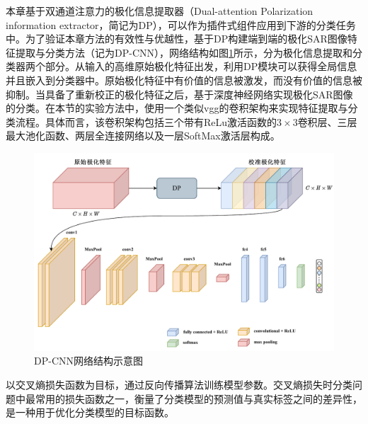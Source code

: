 
本章基于双通道注意力的极化信息提取器（Dual-attention Polarization information extractor，简记为DP），可以作为插件式组件应用到下游的分类任务中。为了验证本章方法的有效性与优越性，基于DP构建端到端的极化SAR图像特征提取与分类方法（记为DP-CNN），网络结构如图\ref{fig:DPCNN}所示，分为极化信息提取和分类器两个部分。从输入的高维原始极化特征出发，利用DP模块可以获得全局信息并且嵌入到分类器中。原始极化特征中有价值的信息被激发，而没有价值的信息被抑制。当具备了重新校正的极化特征之后，基于深度神经网络实现极化SAR图像的分类。在本节的实验方法中，使用一个类似vgg的卷积架构来实现特征提取与分类流程。具体而言，该卷积架构包括三个带有ReLu激活函数的$3\times 3$卷积层、三层最大池化函数、两层全连接网络以及一层SoftMax激活层构成。

\begin{figure}[ht!]
  \centering
  \includegraphics[width=14cm]{pic/chapter3/DPCNN.pdf}
  \caption{DP-CNN网络结构示意图}
  \label{fig:DPCNN}
\end{figure}


以交叉熵损失函数\citing{}为目标，通过反向传播算法训练模型参数。交叉熵损失时分类问题中最常用的损失函数之一，衡量了分类模型的预测值与真实标签之间的差异性，是一种用于优化分类模型的目标函数。

